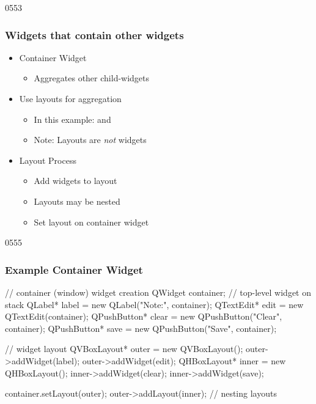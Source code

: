 \begin{slide}{0553}\frametitle{Widgets that contain other widgets}
  
  \begin{itemize}
  \item Container Widget
    \begin{itemize}
    \item Aggregates other child-widgets
    \end{itemize}
  \item Use layouts for aggregation
    \begin{itemize}
    \item In this example:  and \\ 
    \item Note: Layouts are \emph{not} widgets
    \end{itemize}
  \item Layout Process
    \begin{itemize}
    \item Add widgets to layout
    \item Layouts may be nested
    \item Set layout on container widget
    \end{itemize}
  \end{itemize}
\end{slide}

\begin{slide}[fragile]{0555}
  \frametitle{Example Container Widget}
  \begin{cpp}
// container (window) widget creation
QWidget container;          // top-level widget on stack 
QLabel* label = new QLabel("Note:", container);
QTextEdit* edit = new QTextEdit(container);
QPushButton* clear = new QPushButton("Clear", container);
QPushButton* save = new QPushButton("Save", container);
    \end{cpp} 
   \begin{cpp}
// widget layout
QVBoxLayout* outer = new QVBoxLayout();
outer->addWidget(label);
outer->addWidget(edit);
QHBoxLayout* inner = new QHBoxLayout();
inner->addWidget(clear);
inner->addWidget(save);
    \end{cpp} 
  \begin{cpp}
container.setLayout(outer);
outer->addLayout(inner); // nesting layouts
    \end{cpp}
\end{slide}



